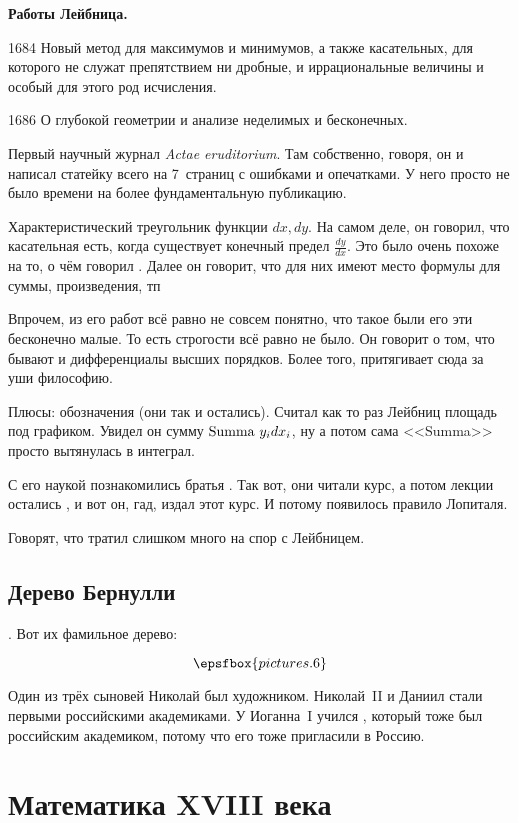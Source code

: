 \documentclass[a4paper,oneside,fleqn,10pt]{article}
\newcommand{\cpic}[1]{$$\epsfbox{pictures.#1}$$}
\begin{document}
\textbf{Работы Лейбница.}

1684 Новый метод для максимумов и минимумов, а также касательных, для
которого не служат препятствием ни дробные, и иррациональные величины
и особый для этого род исчисления.

1686 О глубокой геометрии и анализе неделимых и бесконечных.

Первый научный журнал \emph{Actae eruditorium}. Там собственно,
говоря, он и написал статейку всего на 7~страниц с ошибками и
опечатками.  У него просто не было времени на более фундаментальную
публикацию.

Характеристический треугольник функции $dx,dy$. На самом деле, он
говорил, что касательная есть, когда существует конечный предел
$\frac{dy}{dx}$.  Это было очень похоже на то, о чём говорил
. Далее он говорит, что для них имеют место формулы для
суммы, произведения, тп

Впрочем, из его работ всё равно не совсем понятно, что такое были его
эти бесконечно малые.  То есть строгости всё равно не было. Он говорит
о том, что бывают и дифференциалы высших порядков.  Более того,
притягивает сюда за уши философию.

Плюсы: обозначения (они так и остались). Считал как то раз Лейбниц
площадь под графиком.  Увидел он сумму $\hbox{Summa }y_i dx_i$, ну а
потом сама <<Summa>> просто вытянулась в интеграл.

С его наукой познакомились братья . Так вот, они читали
курс, а потом лекции остались , и вот он,
гад, издал этот курс.  И потому появилось правило Лопиталя.

Говорят, что  тратил слишком много на спор с Лейбницем.

\subsection{Дерево Бернулли}

. Вот их фамильное дерево:

 \cpic{6}

Один из трёх сыновей Николай был художником.  Николай~II и Даниил
стали первыми российскими академиками.  У Иоганна~I учился
, который тоже был российским академиком, потому что его
тоже пригласили в Россию.


\section{Математика XVIII века}
\end{document}
